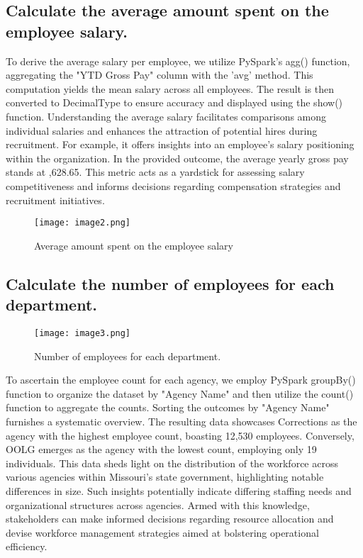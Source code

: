 \documentclass{article}
\begin{document}
\subsection{Calculate the average amount spent on the employee salary.}
To derive the average salary per employee, we utilize PySpark's agg() function, aggregating the "YTD Gross Pay" column with the 'avg' method. This computation yields the mean salary across all employees. The result is then converted to DecimalType to ensure accuracy and displayed using the show() function. Understanding the average salary facilitates comparisons among individual salaries and enhances the attraction of potential hires during recruitment. For example, it offers insights into an employee's salary positioning within the organization. In the provided outcome, the average yearly gross pay stands at ,628.65. This metric acts as a yardstick for assessing salary competitiveness and informs decisions regarding compensation strategies and recruitment initiatives.
\begin{figure}[h!]
    \centering
    \texttt{[image: image2.png]}
    \caption{Average amount spent on the employee salary}
    \label{fig:enter-label}
\end{figure}


\subsection{Calculate the number of employees for each department.}

\begin{figure}[h!]
    \centering
    \texttt{[image: image3.png]}
    \caption{Number of employees for each department.}
    \label{fig:enter-label}
\end{figure}

To ascertain the employee count for each agency, we employ PySpark groupBy() function to organize the dataset by "Agency Name" and then utilize the count() function to aggregate the counts. Sorting the outcomes by "Agency Name" furnishes a systematic overview. The resulting data showcases Corrections as the agency with the highest employee count, boasting 12,530 employees. Conversely, OOLG emerges as the agency with the lowest count, employing only 19 individuals. This data sheds light on the distribution of the workforce across various agencies within Missouri's state government, highlighting notable differences in size. Such insights potentially indicate differing staffing needs and organizational structures across agencies. Armed with this knowledge, stakeholders can make informed decisions regarding resource allocation and devise workforce management strategies aimed at bolstering operational efficiency.
\end{document}
